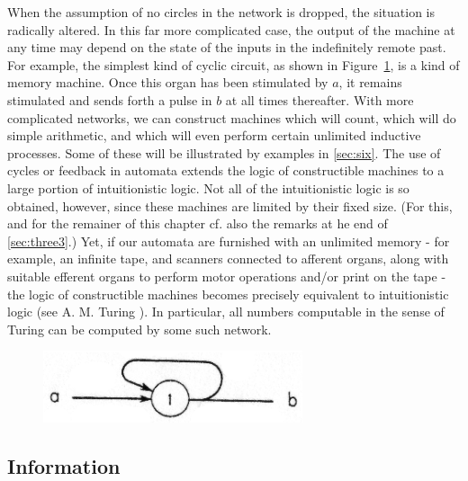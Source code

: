 \documentclass[twocolumn,preprintnumbers,amsmath,amssymb,floatfix]{revtex4}
\begin{document}
When the assumption of no circles in the network is dropped, the
situation is radically altered. In this far more complicated case,
the output of the machine at any time may depend on the state of
the inputs in the indefinitely remote past. For example, the
simplest kind of cyclic circuit, as shown in Figure~\ref{fig:16},
is a kind of memory machine. Once this organ has been stimulated
by $a$, it remains stimulated and sends forth a pulse in $b$ at
all times thereafter. With more complicated networks, we can
construct machines which will count, which will do simple
arithmetic, and which will even perform certain unlimited
inductive processes. Some of these will be illustrated by examples
in \ref{sec:six}. The use of cycles or feedback in automata
extends the logic of constructible machines to a large portion of
intuitionistic logic. Not all of the intuitionistic logic is so
obtained, however, since these machines are limited by their fixed
size. (For this, and for the remainer of this chapter cf. also the
remarks at he end of \ref{sec:three3}.) Yet, if our automata are
furnished with an unlimited memory - for example, an infinite
tape, and scanners connected to afferent organs, along with
suitable efferent organs to perform motor operations and/or print
on the tape - the logic of constructible machines becomes
precisely equivalent to intuitionistic logic (see A. M. Turing
\cite{Turing36}). In particular, all numbers computable in the
sense of Turing can be computed by some such network.

\begin{figure}[b]
\includegraphics[width=3in]{fig_16}
\caption{\label{fig:16}}
\end{figure}

\subsection{\label{sec:five2}Information}
\end{document}
